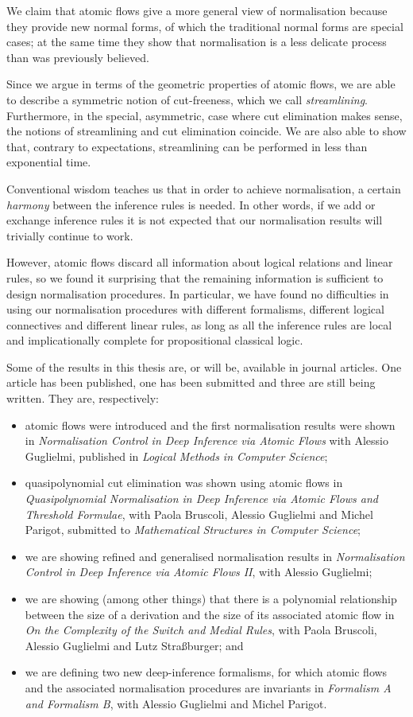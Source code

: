 We claim that atomic flows give a more general view of normalisation because they provide new normal forms, of which the traditional normal forms are special cases; at the same time they show that normalisation is a less delicate process than was previously believed.

Since we argue in terms of the geometric properties of atomic flows, we are able to describe a symmetric notion of cut-freeness, which we call \emph{streamlining}. Furthermore, in the special, asymmetric, case where cut elimination makes sense, the notions of streamlining and cut elimination coincide. We are also able to show that, contrary to expectations, streamlining can be performed in less than exponential time.

Conventional wisdom teaches us that in order to achieve normalisation, a certain \emph{harmony} between the inference rules is needed. In other words, if we add or exchange inference rules it is not expected that our normalisation results will trivially continue to work.

However, atomic flows discard all information about logical relations and linear rules, so we found it surprising that the remaining information is sufficient to design normalisation procedures. In particular, we have found no difficulties in using our normalisation procedures with different formalisms, different logical connectives and different linear rules, as long as all the inference rules are local and implicationally complete for propositional classical logic.

Some of the results in this thesis are, or will be, available in journal articles. One article has been published, one has been submitted and three are still being written. They are, respectively:
\begin{itemize}
 \item atomic flows were introduced and the first normalisation results were shown in \emph{Normalisation Control in Deep Inference via Atomic Flows} with Alessio Guglielmi, published in \emph{Logical Methods in Computer Science};
 \item quasipolynomial cut elimination was shown using atomic flows in \emph{Quasipolynomial Normalisation in Deep Inference via Atomic Flows and Threshold Formulae}, with Paola Bruscoli, Alessio Guglielmi and Michel Parigot, submitted to \emph{Mathematical Structures in Computer Science};
 \item we are showing refined and generalised normalisation results in \emph{Normalisation Control in Deep Inference via Atomic Flows II}, with Alessio Guglielmi;
 \item we are showing (among other things) that there is a polynomial relationship between the size of a derivation and the size of its associated atomic flow in \emph{On the Complexity of the Switch and Medial Rules}, with Paola Bruscoli, Alessio Guglielmi and Lutz Stra\ss{}burger; and
 \item we are defining two new deep-inference formalisms, for which atomic flows and the associated normalisation procedures are invariants in \emph{Formalism A and Formalism B}, with Alessio Guglielmi and Michel Parigot.
\end{itemize}

